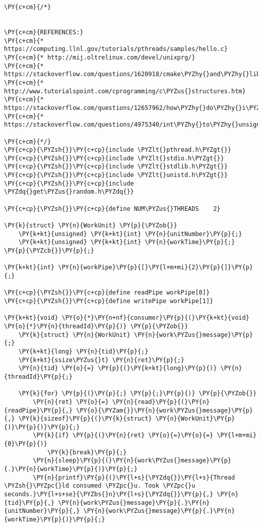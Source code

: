 \begin{Verbatim}[commandchars=\\\{\}]
\PY{c+cm}{/*}


\PY{c+cm}{REFERENCES:}
\PY{c+cm}{* https://computing.llnl.gov/tutorials/pthreads/samples/hello.c}
\PY{c+cm}{* http://mij.oltrelinux.com/devel/unixprg/}
\PY{c+cm}{* https://stackoverflow.com/questions/1620918/cmake\PYZhy{}and\PYZhy{}libpthread}
\PY{c+cm}{* http://www.tutorialspoint.com/cprogramming/c\PYZus{}structures.htm}
\PY{c+cm}{* https://stackoverflow.com/questions/12657962/how\PYZhy{}do\PYZhy{}i\PYZhy{}generate\PYZhy{}a\PYZhy{}random\PYZhy{}number\PYZhy{}between\PYZhy{}two\PYZhy{}variables\PYZhy{}that\PYZhy{}i\PYZhy{}have\PYZhy{}stored}
\PY{c+cm}{* https://stackoverflow.com/questions/4975340/int\PYZhy{}to\PYZhy{}unsigned\PYZhy{}int\PYZhy{}conversion}

\PY{c+cm}{*/}
\PY{c+cp}{\PYZsh{}}\PY{c+cp}{include \PYZlt{}pthread.h\PYZgt{}}
\PY{c+cp}{\PYZsh{}}\PY{c+cp}{include \PYZlt{}stdio.h\PYZgt{}}
\PY{c+cp}{\PYZsh{}}\PY{c+cp}{include \PYZlt{}stdlib.h\PYZgt{}}
\PY{c+cp}{\PYZsh{}}\PY{c+cp}{include \PYZlt{}unistd.h\PYZgt{}}
\PY{c+cp}{\PYZsh{}}\PY{c+cp}{include \PYZdq{}get\PYZus{}random.h\PYZdq{}}

\PY{c+cp}{\PYZsh{}}\PY{c+cp}{define NUM\PYZus{}THREADS    2}

\PY{k}{struct} \PY{n}{WorkUnit} \PY{p}{\PYZob{}}
    \PY{k+kt}{unsigned} \PY{k+kt}{int} \PY{n}{unitNumber}\PY{p}{;}
    \PY{k+kt}{unsigned} \PY{k+kt}{int} \PY{n}{workTime}\PY{p}{;}
\PY{p}{\PYZcb{}}\PY{p}{;}

\PY{k+kt}{int} \PY{n}{workPipe}\PY{p}{[}\PY{l+m+mi}{2}\PY{p}{]}\PY{p}{;}

\PY{c+cp}{\PYZsh{}}\PY{c+cp}{define readPipe workPipe[0]}
\PY{c+cp}{\PYZsh{}}\PY{c+cp}{define writePipe workPipe[1]}

\PY{k+kt}{void} \PY{o}{*}\PY{n+nf}{consumer}\PY{p}{(}\PY{k+kt}{void} \PY{o}{*}\PY{n}{threadId}\PY{p}{)} \PY{p}{\PYZob{}}
    \PY{k}{struct} \PY{n}{WorkUnit} \PY{n}{work\PYZus{}message}\PY{p}{;}
    \PY{k+kt}{long} \PY{n}{tid}\PY{p}{;}
    \PY{k+kt}{ssize\PYZus{}t} \PY{n}{ret}\PY{p}{;}
    \PY{n}{tid} \PY{o}{=} \PY{p}{(}\PY{k+kt}{long}\PY{p}{)} \PY{n}{threadId}\PY{p}{;}

    \PY{k}{for} \PY{p}{(}\PY{p}{;} \PY{p}{;}\PY{p}{)} \PY{p}{\PYZob{}}
        \PY{n}{ret} \PY{o}{=} \PY{n}{read}\PY{p}{(}\PY{n}{readPipe}\PY{p}{,} \PY{o}{\PYZam{}}\PY{n}{work\PYZus{}message}\PY{p}{,} \PY{k}{sizeof}\PY{p}{(}\PY{k}{struct} \PY{n}{WorkUnit}\PY{p}{)}\PY{p}{)}\PY{p}{;}
        \PY{k}{if} \PY{p}{(}\PY{n}{ret} \PY{o}{=}\PY{o}{=} \PY{l+m+mi}{0}\PY{p}{)}
            \PY{k}{break}\PY{p}{;}
        \PY{n}{sleep}\PY{p}{(}\PY{n}{work\PYZus{}message}\PY{p}{.}\PY{n}{workTime}\PY{p}{)}\PY{p}{;}
        \PY{n}{printf}\PY{p}{(}\PY{l+s}{\PYZdq{}}\PY{l+s}{Thread \PYZsh{}\PYZpc{}ld consumed \PYZpc{}u. Took \PYZpc{}u seconds.}\PY{l+s+se}{\PYZbs{}n}\PY{l+s}{\PYZdq{}}\PY{p}{,} \PY{n}{tid}\PY{p}{,} \PY{n}{work\PYZus{}message}\PY{p}{.}\PY{n}{unitNumber}\PY{p}{,} \PY{n}{work\PYZus{}message}\PY{p}{.}\PY{n}{workTime}\PY{p}{)}\PY{p}{;}


\end{Verbatim}
